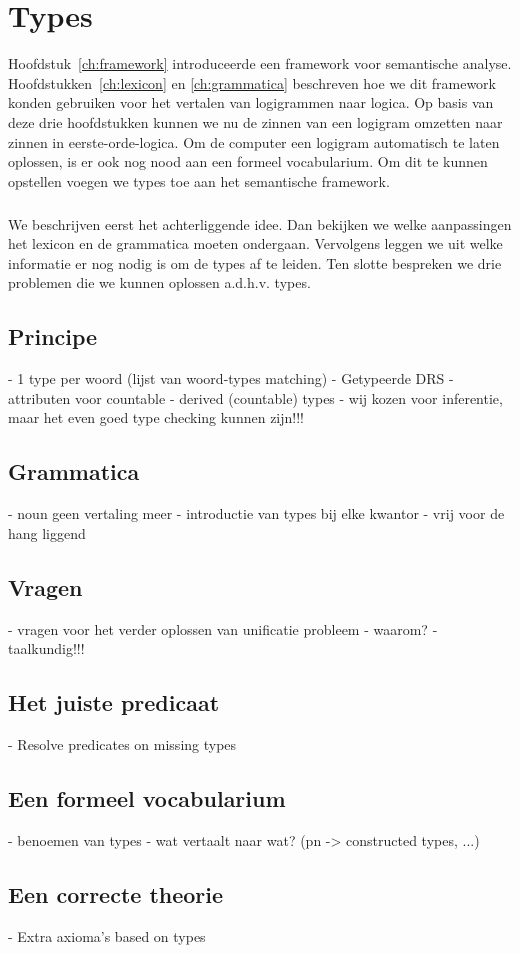 \chapter{Types}
\label{ch:types}

Hoofdstuk~\ref{ch:framework} introduceerde een framework voor semantische analyse. Hoofdstukken~\ref{ch:lexicon} en \ref{ch:grammatica} beschreven hoe we dit framework konden gebruiken voor het vertalen van logigrammen naar logica. Op basis van deze drie hoofdstukken kunnen we nu de zinnen van een logigram omzetten naar zinnen in eerste-orde-logica. Om de computer een logigram automatisch te laten oplossen, is er ook nog nood aan een formeel vocabularium. Om dit te kunnen opstellen voegen we types toe aan het semantische framework.

\paragraph{} We beschrijven eerst het achterliggende idee. Dan bekijken we welke aanpassingen het lexicon en de grammatica moeten ondergaan. Vervolgens leggen we uit welke informatie er nog nodig is om de types af te leiden. Ten slotte bespreken we drie problemen die we kunnen oplossen a.d.h.v. types.

\section{Principe}
- 1 type per woord (lijst van woord-types matching)
- Getypeerde DRS
- attributen voor countable
- derived (countable) types
- wij kozen voor inferentie, maar het even goed type checking kunnen zijn!!!
\section{Grammatica}
- noun geen vertaling meer
- introductie van types bij elke kwantor
- vrij voor de hang liggend
\section{Vragen}
- vragen voor het verder oplossen van unificatie probleem
- waarom?
- taalkundig!!!
\section{Het juiste predicaat}
- Resolve predicates on missing types
\section{Een formeel vocabularium}
- benoemen van types
- wat vertaalt naar wat? (pn -> constructed types, ...)
\section{Een correcte theorie}
- Extra axioma's based on types
